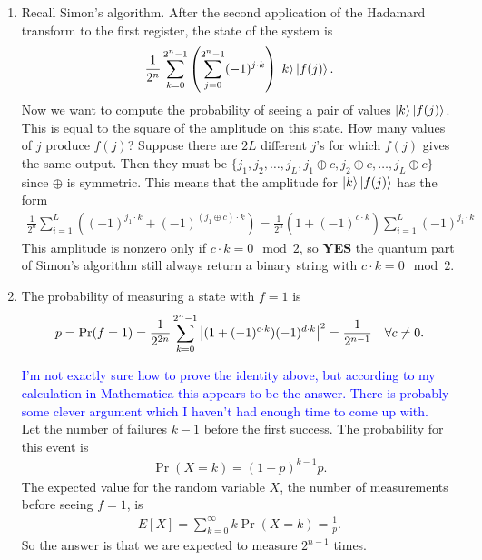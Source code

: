 \documentclass{article}
\theoremstyle{definition}
\newcommand{\f}[2]{\frac{#1}{#2}}
\newcommand{\lp}{\left(}
\newcommand{\rp}{\right)}
\begin{document}
\begin{enumerate}[label=(\alph*)]
	\item Recall Simon's algorithm. After the second application of the Hadamard transform to the first register, the state of the system is 
	\begin{align*}
		\f{1}{2^n} \sum_{k=0}^{2^n-1} \lp \sum_{j=0}^{2^n-1} (-1)^{j\cdot k} \rp \ket{k} \ket{f(j)}.
	\end{align*}
	Now we want to compute the probability of seeing a pair of values $\ket{k} \ket{f(j)}$. This is equal to the square of the amplitude on this state. How many values of $j$ produce $f(j)$? Suppose there are $2L$ different $j$'s for which $f(j)$ gives the same output. Then they must be $\{  j_1, j_2,\dots, j_L, j_1\oplus c, j_2\oplus c, \dots, j_L\oplus c \}$ since $\oplus$ is symmetric. This means that the amplitude for $\ket{k}\ket{f(j)}$ has the form
	\begin{align*}
		\f{1}{2^n} \sum_{i=1}^L \lp (-1)^{j_1\cdot k} + (-1)^{{(j_1\oplus c)}\cdot k }\rp = \f{1}{2^n}(1 + (-1)^{c\cdot k}) \sum_{i=1}^L (-1)^{j_i\cdot k}
	\end{align*}
	This amplitude is nonzero only if $c\cdot k = 0 \mod 2$, so \textbf{YES} the quantum part of Simon's algorithm still always return a binary string with $c\cdot k = 0 \mod 2$. 
	
	\item The probability of measuring a state with $f=1$ is 
	\begin{align*}
		p = \Pr(f=1) = \f{1}{2^{2n}}\sum_{k=0}^{2^n-1} \abs{ (1+(-1)^{c\cdot k})(-1)^{d\cdot k}}^2 = \f{1}{2^{n-1}}\quad \forall c\neq 0.
	\end{align*}

	\textcolor{blue}{I'm not exactly sure how to prove the identity above, but according to my calculation in Mathematica this appears to be the answer. There is probably some clever argument which I haven't had enough time to come up with.}\\

	Let the number of failures $k-1$ before the first success. The probability for this event is 
	\begin{align*}
		\Pr(X=k) = (1-p)^{k-1}p.
	\end{align*}
	The expected value for the random variable $X$, the number of measurements before seeing $f=1$, is 
	\begin{align*}
		E[X] = \sum_{k=0}^\infty k \Pr(X=k) = \f{1}{p}.
	\end{align*}
	So the answer is that we are expected to measure  $\boxed{2^{n-1}}$  times. \\
	

\end{enumerate}
\end{document}
